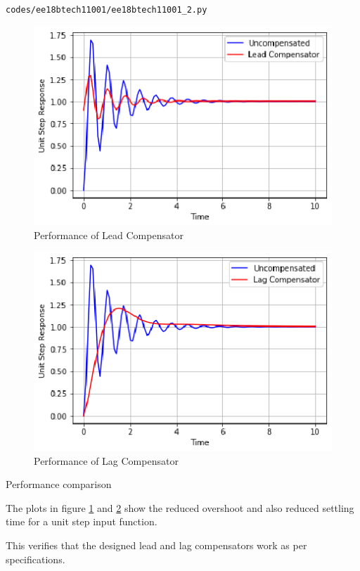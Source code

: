 \begin{lstlisting}[frame=single]
codes/ee18btech11001/ee18btech11001_2.py
\end{lstlisting}
\begin{figure}[!ht]
\centering
    \includegraphics[width=\columnwidth]{./figs/ee18btech11001/ee18btech11001_4.eps}
  \caption{Performance of Lead Compensator}
  \label{fig:ee18btech11001_fig4}
\end{figure}
\begin{figure}[!ht]
\centering
    \includegraphics[width=\columnwidth]{./figs/ee18btech11001/ee18btech11001_5.eps}
  \caption{Performance of Lag Compensator}
  \label{fig:ee18btech11001_fig5}
\end{figure}
\begin{table}[!ht]
\centering

\caption{Performance comparison}
\label{table:ee18btech11001_2}
\end{table}
The plots in figure \ref{fig:ee18btech11001_fig4} and \ref{fig:ee18btech11001_fig5} show the reduced overshoot and also reduced settling time for a unit step input function. 

This verifies that the designed lead and lag compensators work as per specifications. 
